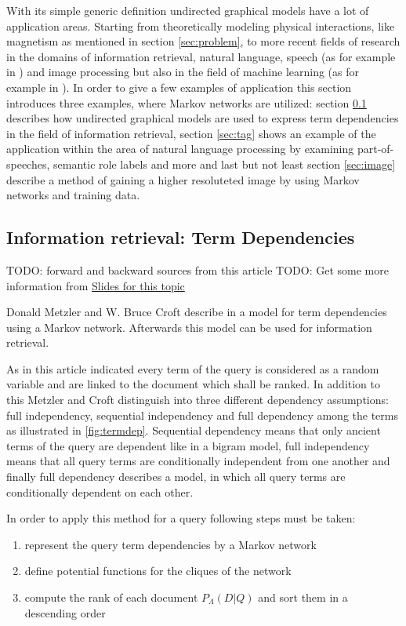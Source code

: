 With its simple generic definition undirected graphical models have a lot of application areas. Starting from theoretically modeling physical interactions, like magnetism as mentioned in section \ref{sec:problem}, to more recent fields of research in the domains of information retrieval, natural language, speech (as for example in \cite{}) and image processing but also in the field of machine learning (as for example in \cite{}). In order to give a few examples of application this section introduces three examples, where Markov networks are utilized: section \ref{sec:term} describes how undirected graphical models are used to express term dependencies in the field of information retrieval, section \ref{sec:tag} shows an example of the application within the area of natural language processing by examining part-of-speeches, semantic role labels and more and last but not least section \ref{sec:image} describe a method of gaining a higher resoluteted image by using Markov networks and training data.

\subsection{Information retrieval: Term Dependencies}
\label{sec:term}

TODO: forward and backward sources from this article \cite{metzler2005markov}
TODO: Get some more information from \href{http:\\www.slideplayer.com/slide/6012545}{Slides for this topic}

Donald Metzler and W. Bruce Croft describe in \cite{metzler2005markov} a model for term dependencies using a Markov network. Afterwards this model can be used for information retrieval.

As in this article indicated every term of the query is considered as a random variable and are linked to the document which shall be ranked. In addition to this Metzler and Croft distinguish into three different dependency assumptions: full independency, sequential independency and full dependency among the terms as illustrated in \ref{fig:termdep}. Sequential dependency means that only ancient terms of the query are dependent like in a bigram model, full independency means that all query terms are conditionally independent from one another and finally full dependency describes a model, in which all query terms are conditionally dependent on each other.

In order to apply this method for a query following steps must be taken:
\begin{enumerate}
\item represent the query term dependencies by a Markov network
\item define potential functions for the cliques of the network
\item compute the rank of each document $P_\Lambda (D|Q)$ and sort them in a descending order
\end{enumerate}

